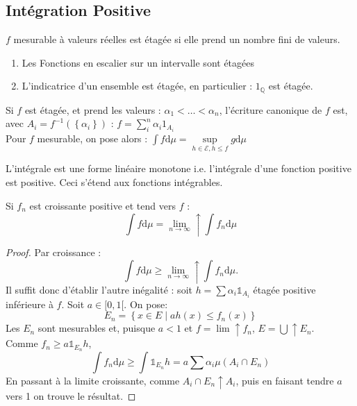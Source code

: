 \documentclass{cours}
\begin{document}
    \subsection{Intégration Positive}
    \begin{definition}
        $f$ mesurable à valeurs réelles est étagée si elle prend un nombre fini de valeurs. 
    \end{definition}
    \begin{remark}
        \begin{enumerate}
            \item Les Fonctions en escalier sur un intervalle sont étagées
            \item L'indicatrice d'un ensemble est étagée, en particulier : $1_{\mathbb{Q}}$ est étagée.
        \end{enumerate}
    \end{remark}
    \begin{definition}
        Si $f$ est étagée, et prend les valeurs : $\alpha_{1} < \ldots < \alpha_{n}$, l'écriture canonique de $f$ est, avec $A_{i} = f^{-1}(\left\{\alpha_{i}\right\})$ : 
        $f =  \sum\limits_{i}^{n} \alpha_{i}1_{A_{i}}$\\
        Pour $f$ mesurable, on pose alors : $\int f \mathrm{d}\mu = \sup\limits_{h \in \mathcal{E}, h \leq f} g \mathrm{d}\mu$
    \end{definition}
    \begin{proposition}
        L'intégrale est une forme linéaire monotone i.e. l'intégrale d'une fonction positive est positive. Ceci s'étend aux fonctions intégrables.
    \end{proposition}
    \begin{theorem}\label{TCM}
        Si $f_{n}$ est croissante positive et tend vers $f$ :
        \[
            \int f \mathrm{d}\mu = \lim_{n\to \infty} \uparrow \int f_{n} \mathrm{d} \mu
        \]
    \end{theorem}
    \begin{proof}
        Par croissance : \[ \int f \mathrm{d}\mu \geq \lim_{n \to \infty}\uparrow \int f_{n} \mathrm{d}\mu.\]
        Il suffit donc d'établir l'autre inégalité : soit $h = \sum \alpha_{i}\mathds{1}_{A_{i}}$ étagée positive inférieure à $f$. Soit $a \in [0, 1[$. On pose: \[E_{n} =\left\{x \in E \mid ah(x) \leq f_{n}(x)\right\}\]
        Les $E_{n}$ sont mesurables et, puisque $a < 1$ et $f = \lim \uparrow f_{n}$, $E = \bigcup \uparrow E_{n}$.\\
        Comme $f_{n} \geq a\mathds{1}_{E_{n}}h$, \[\int f_{n} \mathrm{d}\mu \geq \int \mathds{1}_{E_{n}}h = a \sum \alpha_{i}\mu(A_{i}\cap E_{n})\]
        En passant à la limite croissante, comme $A_{i} \cap E_{n} \uparrow A_{i}$, puis en faisant tendre $a$ vers 1 on trouve le résultat. 
    \end{proof}
\end{document}
